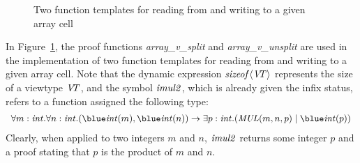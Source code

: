 \begin{figure}

\caption{Two function templates for reading from and writing to a given array cell}
\label{figure:array_get_set_elt_at.dats}
\end{figure}
In Figure~\ref{figure:array_get_set_elt_at.dats}, the proof functions {\it
array\_v\_split} and {\it array\_v\_unsplit} are used in the implementation
of two function templates for reading from and writing to a given array
cell. Note that the dynamic expression ${\it sizeof}\langle{\it V\!\!T}\rangle$
represents the size of a viewtype ${\it V\!\!T}$, and the symbol ${\it imul2}$,
which is already given the infix status, refers to a function assigned the
following type:
\[\begin{array}{c}
\forall m:\sint.\forall n:\sint.
(\tint(m), \tint(n))\timp \exists p:\sint.({\it MUL}(m, n, p) \mid \tint (p)) \\
\end{array}\]
Clearly, when applied to two integers $m$ and $n$, ${\it imul2}$ returns
some integer $p$ and a proof stating that $p$ is the product of $m$ and
$n$.


